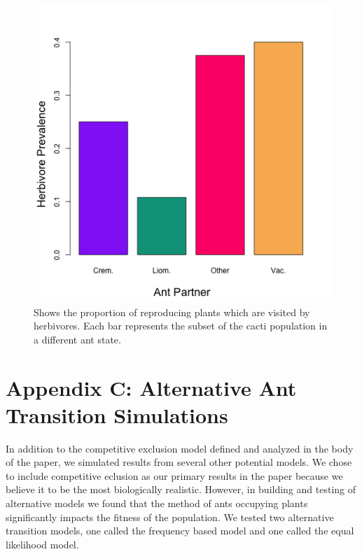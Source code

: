\documentclass[11pt]{article}
\begin{document}
\begin{figure}
	\includegraphics[width=0.91\linewidth]{Figures/herb_all.png}
	\caption{Shows the proportion of reproducing plants which are visited by herbivores. Each bar represents the subset of the cacti population in a different ant state.  }
	\label{app:herb}
\end{figure}

\section*{Appendix C: Alternative Ant Transition Simulations}\label{appendix:C}
In addition to the competitive exclusion model defined and analyzed in the body of the paper, we simulated results from several other potential models. 
We chose to include competitive eclusion as our primary results in the paper because we believe it to be the most biologically realistic.
However, in building and testing of alternative models we found that the method of ants occupying plants significantly impacts the fitness of the population. 
We tested two alternative transition models, one called the frequency based model and one called the equal likelihood model. 
\end{document}
